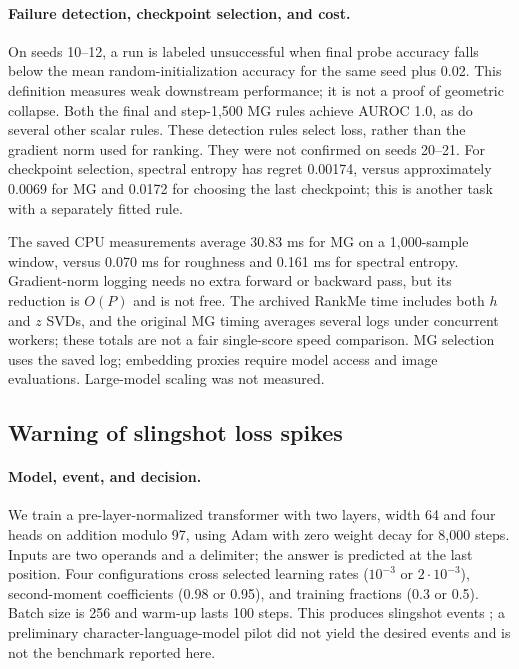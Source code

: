 {\begin{table}[htbp]
\centering\small
\caption{All frozen SSL selectors over the five evaluated seeds. Score signs and logs were chosen only on development runs. The secondary MG setting uses $\tau=4,k=50$.}
\label{tab:ssl_all}

\end{table}

\paragraph{Failure detection, checkpoint selection, and cost.}
On seeds 10--12, a run is labeled unsuccessful when final probe accuracy falls below the mean random-initialization accuracy for the same seed plus 0.02. This definition measures weak downstream performance; it is not a proof of geometric collapse. Both the final and step-1,500 MG rules achieve AUROC 1.0, as do several other scalar rules. These detection rules select loss, rather than the gradient norm used for ranking. They were not confirmed on seeds 20--21. For checkpoint selection, spectral entropy has regret 0.00174, versus approximately 0.0069 for MG and 0.0172 for choosing the last checkpoint; this is another task with a separately fitted rule.

The saved CPU measurements average 30.83 ms for MG on a 1,000-sample window, versus 0.070 ms for roughness and 0.161 ms for spectral entropy. Gradient-norm logging needs no extra forward or backward pass, but its reduction is $O(P)$ and is not free. The archived RankMe time includes both $h$ and $z$ SVDs, and the original MG timing averages several logs under concurrent workers; these totals are not a fair single-score speed comparison. MG selection uses the saved log; embedding proxies require model access and image evaluations. Large-model scaling was not measured.

\subsection{Warning of slingshot loss spikes}
\paragraph{Model, event, and decision.}
We train a pre-layer-normalized transformer with two layers, width 64 and four heads on addition modulo 97, using Adam with zero weight decay for 8,000 steps. Inputs are two operands and a delimiter; the answer is predicted at the last position. Four configurations cross selected learning rates ($10^{-3}$ or $2\cdot10^{-3}$), second-moment coefficients (0.98 or 0.95), and training fractions (0.3 or 0.5). Batch size is 256 and warm-up lasts 100 steps. This produces slingshot events \citep{thilak2022slingshot}; a preliminary character-language-model pilot did not yield the desired events and is not the benchmark reported here.

}
